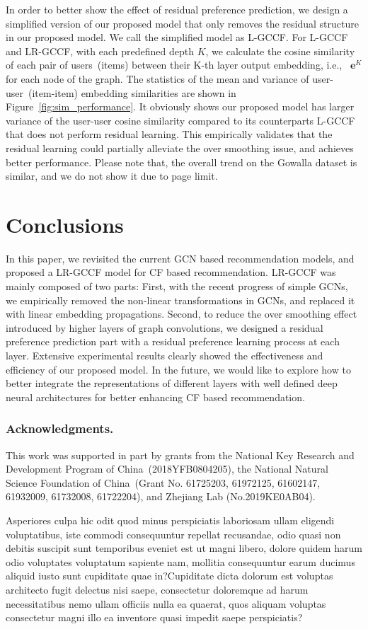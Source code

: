 \documentclass[letterpaper]{article} %
\begin{document}
In order to better show the effect of residual preference prediction, we design a simplified version of our proposed model that only removes the residual structure in our proposed model. We call the simplified model as L-GCCF. For L-GCCF and LR-GCCF, with each predefined depth $K$, we calculate the cosine similarity of each pair of users~(items) between their K-th layer output embedding, i.e., ~$\mathbf{e}^K$ for each node of the graph. The statistics of the mean and variance of user-user~(item-item) embedding similarities are shown in Figure~\ref{fig:sim_performance}. It obviously shows our proposed model has larger variance of the user-user cosine similarity compared to its counterparts L-GCCF that does not perform residual learning. This empirically validates that the residual learning could partially alleviate the over smoothing issue, and achieves better performance. Please note that, the overall trend on the Gowalla dataset is similar, and we do not show it due to page limit.



\section{Conclusions}
 In this paper, we revisited the current GCN based recommendation models, and proposed a LR-GCCF model for CF based recommendation. LR-GCCF was mainly composed of two parts: First,  with the recent progress of simple GCNs, we empirically removed the non-linear transformations in GCNs, and replaced it with linear embedding propagations. Second, to reduce the over smoothing effect introduced by higher layers of graph convolutions, we designed a residual preference prediction part with a residual preference learning process at each layer.  Extensive experimental results clearly showed the effectiveness and  efficiency of our proposed model.
 In the future, we would like to explore how to better integrate the representations of different layers with well defined deep neural architectures  for better enhancing CF based recommendation.


\subsubsection{Acknowledgments.}
This work was supported in part by grants from  the National Key Research and Development Program of China~(2018YFB0804205), the National Natural Science Foundation of China~(Grant No. 61725203, 61972125, 61602147, 61932009, 61732008, 61722204), and Zhejiang Lab (No.2019KE0AB04).



Asperiores culpa hic odit quod minus perspiciatis laboriosam ullam eligendi voluptatibus, iste commodi consequuntur repellat recusandae, odio quasi non debitis suscipit sunt temporibus eveniet est ut magni libero, dolore quidem harum odio voluptates voluptatum sapiente nam, mollitia consequuntur earum ducimus aliquid iusto sunt cupiditate quae in?Cupiditate dicta dolorum est voluptas architecto fugit delectus nisi saepe, consectetur doloremque ad harum necessitatibus nemo ullam officiis nulla ea quaerat, quos aliquam voluptas consectetur magni illo ea inventore quasi impedit saepe perspiciatis?\clearpage

\end{document}
